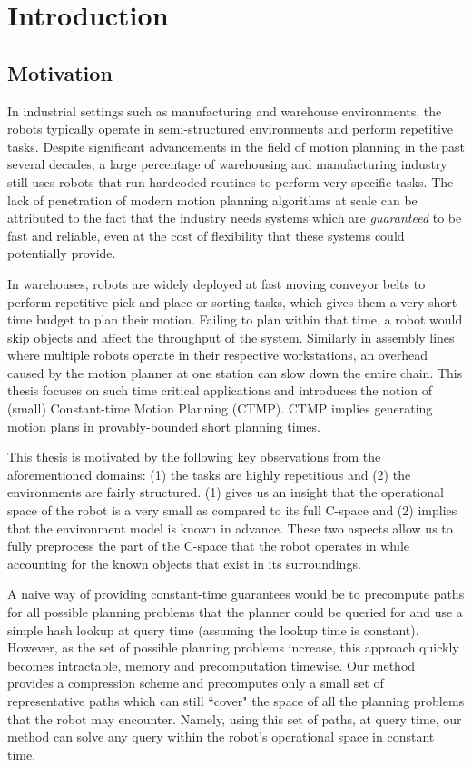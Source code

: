 \documentclass[a4paper]{report}
\begin{document}
\tableofcontents
\newpage

\chapter{Introduction}
\section{Motivation}
In industrial settings such as manufacturing and warehouse environments, the robots typically operate in semi-structured environments and perform repetitive tasks. Despite significant advancements in the field of motion planning in the past several decades, a large percentage of warehousing and manufacturing industry still uses robots that run hardcoded routines to perform very specific tasks. The lack of penetration of modern motion planning algorithms at scale can be attributed to the fact that the industry needs systems which are \emph{guaranteed} to be fast and reliable, even at the cost of flexibility that these systems could potentially provide.

In warehouses, robots are widely deployed at fast moving conveyor belts to perform repetitive pick and place or sorting tasks, which gives them a very short time budget to plan their motion. Failing to plan within that time, a robot would skip objects and affect the throughput of the system. Similarly in assembly lines where multiple robots operate in their respective workstations, an overhead caused by the motion planner at one station can slow down the entire chain. This thesis focuses on such time critical applications and introduces the notion of (small) Constant-time Motion Planning (CTMP). CTMP implies generating motion plans in provably-bounded short planning times.

This thesis is motivated by the following key observations from the aforementioned domains: (1) the tasks are highly repetitious and (2) the  environments are fairly structured. (1) gives us an insight that the operational space of the robot is a very small as compared to its full C-space and (2) implies that the environment model is known in advance. These two aspects allow us to fully preprocess the part of the C-space that the robot operates in while accounting for the known objects that exist in its surroundings.

A naive way of providing constant-time guarantees would be to precompute paths for all possible planning problems that the planner could be queried for and use a simple hash lookup at query time (assuming the lookup time is constant). However, as the set of possible planning problems increase, this approach quickly becomes intractable, memory and precomputation timewise. Our method provides a compression scheme and precomputes only a small set of representative paths which can still ``cover" the space of all the planning problems that the robot may encounter. Namely, using this set of paths, at query time, our method can solve any query within the robot's operational space in constant time.
\end{document}
